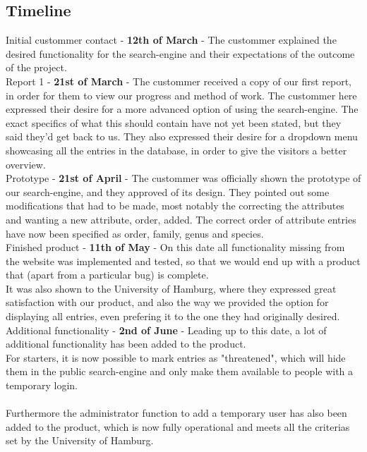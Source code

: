\documentclass[12pt,a4paper]{article}
\begin{document}
\subsection{Timeline}

	Initial custommer contact - {\bf 12th of March} - The custommer explained the desired functionality for the search-engine and their expectations of the outcome of the project. \\
	
	
	Report 1 - {\bf 21st of March} - The custommer received a copy of our first report, in order for them to view our progress and method of work.
	The custommer here expressed their desire for a more advanced option of using the search-engine. The exact specifics of what this should contain have not yet been stated, but they said they'd get back to us.
	They also expressed their desire for a dropdown menu showcasing all the entries in the database, in order to give the visitors a better overview.\\
	
	
	Prototype - {\bf 21st of April} - The custommer was officially shown the prototype of our search-engine, and they approved of its design. They pointed out some modifications that had to be made, most notably the correcting the attributes and wanting a new attribute, order, added. The correct order of attribute entries have now been specified as order, family, genus and species.\\
	
	Finished product - {\bf 11th of May} - On this date all functionality missing from the website was implemented and tested, so that we would end up with a product that (apart from a particular bug) is complete.\\
	It was also shown to the University of Hamburg, where they expressed great satisfaction with our product, and also the way we provided the option for displaying all entries, even prefering it to the one they had originally desired.\\
	
	Additional functionality - {\bf 2nd of June} - Leading up to this date, a lot of additional functionality has been added to the product.\\
	For starters, it is now possible to mark entries as "threatened", which will hide them in the public search-engine and only make them available to people with a temporary login.\\
	\\Furthermore the administrator function to add a temporary user has also been added to the product, which is now fully operational and meets all the criterias set by the University of Hamburg.
\end{document}
